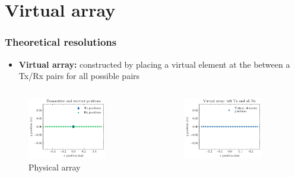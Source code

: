 \documentclass[UKenglish,8pt,aspectratio=1610]{beamer}
\begin{document}
\section{Virtual array}
\begin{frame}
	\frametitle{Theoretical resolutions}
\begin{itemize}
	\item \textbf{Virtual array:} constructed by placing a virtual element at the between a Tx/Rx pairs for all possible pairs
\end{itemize}
\begin{columns}
	\begin{column}{0.33\textwidth}
		\begin{figure}[h!]
			\includegraphics[width=0.8\textwidth]{question2/rx_and_tx_postions.pdf}
			\centering
			\caption{Physical array}
		\end{figure}
	\end{column}
	\begin{column}{0.33\textwidth}
	\begin{figure}[h!]
		\includegraphics[width=0.8\textwidth]{question2/virtual_array_left_tx.pdf}

\end{figure}
\end{column}
\end{columns}
\end{frame}
\end{document}
